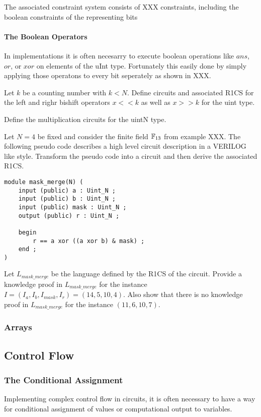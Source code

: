 The associated constraint system consists of XXX constraints, including the boolean constraints of the representing bits
\paragraph{The Boolean Operators} In implementations it is often necesarry to execute boolean operations like $ans$, $or$, or $xor$ on elements of the uInt type. Fortunately this easily done by simply applying those operatons to every bit seperately as shown in XXX.  
\begin{exercise}
Let $k$ be a counting number with $k<N$. Define circuits and associated R1CS for the left and righr bishift operators $x<<k$ as well as $x>>k$ for the uint type. 
\end{exercise}
\begin{exercise}
Define the multiplication circuits for the uintN type.
\end{exercise}
\begin{exercise} Let $N=4$ be fixed and consider the finite field $\mathbb{F}_{13}$ from example XXX. The following pseudo code describes a high level circuit description in a VERILOG like style. Transform the pseudo code into a circuit and then derive the associated R1CS. 
\begin{lstlisting}
module mask_merge(N) (
	input (public) a : Uint_N ;
	input (public) b : Uint_N ;
	input (public) mask : Uint_N ;
	output (public) r : Uint_N ;

	begin
		r == a xor ((a xor b) & mask) ;
	end ;
)
\end{lstlisting}
Let $L_{mask\_merge}$ be the language defined by the R1CS of the circuit. Provide a knowledge proof in $L_{mask\_merge}$ for the instance $I=(I_a, I_b, I_{mask}, I_r) = (14, 5, 10, 4)$. Also show that there is no knowledge proof in $L_{mask\_merge}$ for the instance $(11, 6, 10, 7)$.
\end{exercise}
\subsubsection{Arrays}

\subsection{Control Flow}
\subsubsection{The Conditional Assignment} Implementing complex control flow in circuits, it is often necessary to have a way for conditional assignment of values or computational output to variables.

